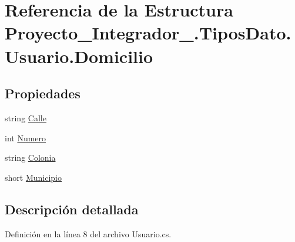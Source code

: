 \hypertarget{struct_proyecto___integrador__3_1_1_tipos_dato_1_1_usuario_1_1_domicilio}{\section{Referencia de la Estructura Proyecto\-\_\-\-Integrador\-\_.\-Tipos\-Dato.\-Usuario.\-Domicilio}
\label{struct_proyecto___integrador__3_1_1_tipos_dato_1_1_usuario_1_1_domicilio}
}
\subsection*{Propiedades}
\begin{DoxyCompactItemize}
\item 
string \hyperlink{struct_proyecto___integrador__3_1_1_tipos_dato_1_1_usuario_1_1_domicilio_ac7f639c760a904e006a4ea6a3db05dff}{Calle}
\item 
int \hyperlink{struct_proyecto___integrador__3_1_1_tipos_dato_1_1_usuario_1_1_domicilio_a31d02de9239bc44c3da8022fc36419e1}{Numero}
\item 
string \hyperlink{struct_proyecto___integrador__3_1_1_tipos_dato_1_1_usuario_1_1_domicilio_a0782bc382740439c8b0340518e7ad972}{Colonia}
\item 
short \hyperlink{struct_proyecto___integrador__3_1_1_tipos_dato_1_1_usuario_1_1_domicilio_a909e9dfc0615a13937e6c4134dca57c5}{Municipio}
\end{DoxyCompactItemize}


\subsection{Descripción detallada}


Definición en la línea 8 del archivo Usuario.\-cs.



